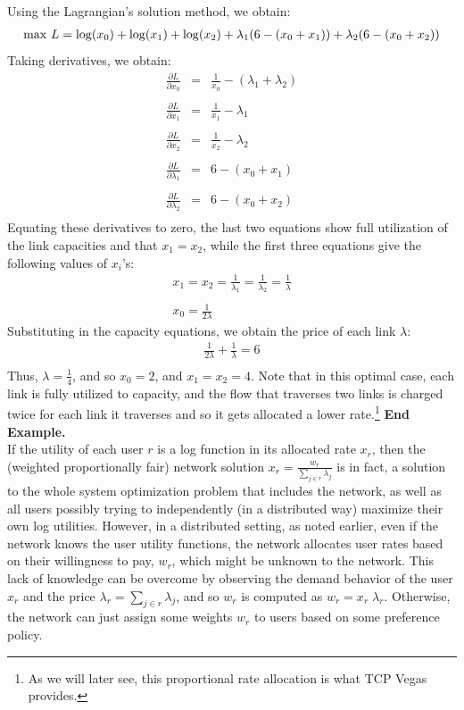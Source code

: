 \documentclass{article}
\def\lg{{\rm log}}
\begin{document}
Using the Lagrangian's solution method, we obtain:
\begin{eqnarray*}
{\rm max}\ L = \lg(x_0) + \lg(x_1) + \lg(x_2) + \lambda_1(6- (x_0+x_1)) + \lambda_2(6- (x_0+x_2))
\end{eqnarray*}
Taking derivatives, we obtain:
\[
\begin{array}{ccc}
  \frac{\partial L}{\partial x_0} & =   & \frac{1}{x_0} - (\lambda_1+ \lambda_2)   \\ \\
  \frac{\partial L}{\partial x_1} & =   & \frac{1}{x_1} - \lambda_1   \\ \\
  \frac{\partial L}{\partial x_2} & =   & \frac{1}{x_2} - \lambda_2   \\ \\
  \frac{\partial L}{\partial \lambda_1} & =  & 6 -   (x_0+x_1)\\ \\
  \frac{\partial L}{\partial \lambda_2} & =  & 6 -   (x_0+x_2) \\
\end{array}
\]
Equating these derivatives to zero, the last two equations show full utilization of the link capacities and that $x_1=x_2$, while the first three equations give the following values of $x_i$'s: 
\begin{eqnarray*}
x_1 = x_2 = \frac{1}{\lambda_1} = \frac{1}{\lambda_2} = \frac{1}{\lambda} \\ \\
x_0 = \frac{1}{2 \lambda}
\end{eqnarray*}
Substituting in the capacity equations, we obtain the price of each link $\lambda$:
\begin{eqnarray*}
\frac{1}{2\lambda} + \frac{1}{\lambda} = 6 \\ 
\end{eqnarray*}
Thus, $\lambda = \frac{1}{4}$, and so $x_0 = 2$, and $x_1 = x_2 = 4$. 
Note that in this optimal case, each link is fully utilized to capacity, and the flow that traverses two links is charged twice for each link it traverses and so it gets allocated a lower rate.\footnote{As we will later see,
this proportional rate allocation is what TCP Vegas \cite{vegas:1995} provides.}
{\bf End Example.}\\


If the utility of each user $r$ is a log function in its allocated rate $x_r$, then the (weighted proportionally fair) network solution 
$x_r = \frac{w_r}{\sum_{j \in r} \lambda_j}$ is in fact, a solution to the whole system optimization problem that includes the network, as well as all users possibly trying to independently (in a distributed way) maximize their own log utilities.
However, in a distributed setting,
as noted earlier, even if the network knows the user utility functions,
the network allocates user rates based on their willingness to pay, $w_r$, which might be unknown to the network.
This lack of knowledge can be overcome by observing the demand behavior of the user $x_r$ and 
the price $\lambda_r = \sum_{j \in r} \lambda_j$, and so $w_r$ is computed as $w_r = x_r \; \lambda_r$.
Otherwise, the network can just assign some weights $w_r$ to users based on some preference policy.
\end{document}
